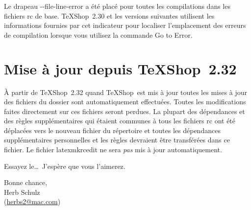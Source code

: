 \documentclass[11pt,french]{article}
\newcommand{\TS}{\textsf{\TeX Shop}}
\newcommand{\mnu}[1]{\textsf{#1}}
\newcommand{\cmd}[1]{\textsf{#1}}
\begin{document}
Le drapeau \cmd{-{}-file-line-error} a été placé pour toutes les compilations dans les fichiers \cmd{rc} de base. \TS\ 2.30 et les versions suivantes utilisent les informations fournies par cet indicateur pour localiser l'emplacement des erreurs de compilation lorsque vous utilisez la commande \mnu{Go to Error}.

%


\section{Mise à jour depuis \TS\ 2.32}

À partir de \TS\ 2.32 quand \TS\ est mis à jour toutes les mises à jour des fichiers du dossier  sont automatiquement effectuées. Toutes les modifications faites directement sur ces fichiers seront perdues. La plupart des dépendances et des règles supplémentaires qui étaient communes à tous les fichiers \cmd{rc} ont été déplacées vers le nouveau fichier du répertoire  et toutes les dépendances supplémentaires personnelles et les règles devraient être transférées dans ce fichier. Le fichier \cmd{latexmkrcedit} ne sera \emph{pas} mis à jour automatiquement.


\vspace{5pt plus 2pt minus 1pt}\noindent
Essayez le\dots\ J'espère que vous l'aimerez.

\vspace{5pt plus 2pt minus 1pt}
\noindent Bonne chance,\\
Herb Schulz\\
(\href{mailto:herbs2@mac.com}{herbs2@mac.com})
\end{document}
